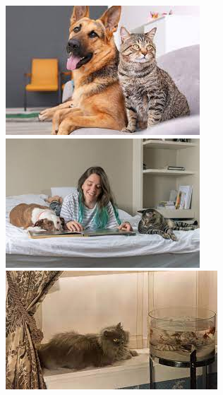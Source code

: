 \begin{figure}[H]
\centering
\begin{minipage}{0.3\textwidth}%
 \includegraphics[width=\textwidth]{Graphics/Images/image_10.jpg}
 \caption{ }
 \label{fig:10}
\end{minipage}%
\begin{minipage}{0.3\textwidth}
 \includegraphics[width=\textwidth]{Graphics/Images/image_11.jpg}
 \caption{ }
 \label{fig:11}
\end{minipage}
\begin{minipage}{0.3\textwidth}
 \includegraphics[width=\textwidth]{Graphics/Images/image_12.jpg}
 \caption{ }
 \label{fig:12}
\end{minipage}
\end{figure}

